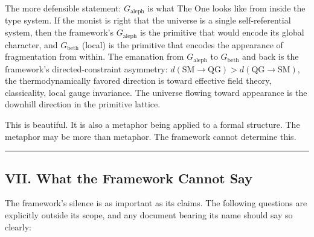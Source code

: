 \documentclass[12pt,a4paper]{article}
\begin{document}
The more defensible statement: $G_\text{aleph}$ is what The One looks like from inside the type system. If the monist is right that the universe is a single self-referential system, then the framework's $G_\text{aleph}$ is the primitive that would encode its global character, and $G_\text{beth}$ (local) is the primitive that encodes the appearance of fragmentation from within. The emanation from $G_\text{aleph}$ to $G_\text{beth}$ and back is the framework's directed-constraint asymmetry: $d(\text{SM} \rightarrow \text{QG}) > d(\text{QG} \rightarrow \text{SM})$, the thermodynamically favored direction is toward effective field theory, classicality, local gauge invariance. The universe flowing toward appearance is the downhill direction in the primitive lattice.

This is beautiful. It is also a metaphor being applied to a formal structure. The metaphor may be more than metaphor. The framework cannot determine this.

\begin{center}
\rule{0.5\textwidth}{0.4pt}
\end{center}

\subsection{VII. What the Framework Cannot Say}

The framework's silence is as important as its claims. The following questions are explicitly outside its scope, and any document bearing its name should say so clearly:
\end{document}
